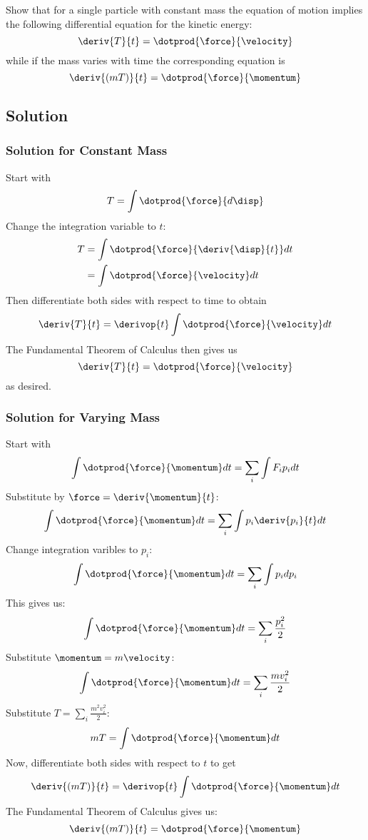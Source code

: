 Show that for a single particle with constant mass the equation of
motion implies the following differential equation for the kinetic energy:
\[\deriv{T}{t} = \dotprod{\force}{\velocity}\]
while if the mass varies with time the corresponding equation is
\[\deriv{(mT)}{t} = \dotprod{\force}{\momentum}\]

\subsection*{Solution}

\subsubsection*{Solution for Constant Mass}

Start with
\[T = \int\dotprod{\force}{d\disp}\]
Change the integration variable to $t$:
\begin{align*}
  T
  &=
  \int\dotprod{\force}{\deriv{\disp}{t}}dt \\
  &=
  \int\dotprod{\force}{\velocity}dt \\
\end{align*}
Then differentiate both sides with respect to time to obtain
\[
\deriv{T}{t}
=
\derivop{t}\int\dotprod{\force}{\velocity}dt
\]
The Fundamental Theorem of Calculus then gives us
\[
\deriv{T}{t}
=
\dotprod{\force}{\velocity}
\]
as desired.

\subsubsection*{Solution for Varying Mass}

Start with
\[
\int\dotprod{\force}{\momentum}dt
=
\sum_i\int F_i p_i dt
\]
Substitute by $\force = \deriv{\momentum}{t}$:
\[
\int\dotprod{\force}{\momentum}dt
=
\sum_i\int p_i \deriv{p_i}{t}dt
\]
Change integration varibles to $p_i$:
\[
\int\dotprod{\force}{\momentum}dt
=
\sum_i\int p_i dp_i
\]
This gives us:
\[
\int\dotprod{\force}{\momentum}dt
=
\sum_i\frac{p_i^2}{2}
\]
Substitute $\momentum = m\velocity$:
\[
\int\dotprod{\force}{\momentum}dt
=
\sum_i\frac{mv_i^2}{2}
\]
Substitute $T = \sum_i\frac{m^2v_i^2}{2}$:
\[
mT
=
\int\dotprod{\force}{\momentum}dt
\]
Now, differentiate both sides with respect to $t$ to get
\[
\deriv{(mT)}{t}
=
\derivop{t}
\int\dotprod{\force}{\momentum}dt
\]
The Fundamental Theorem of Calculus gives us:
\[
\deriv{(mT)}{t}
=
\dotprod{\force}{\momentum}
\]
